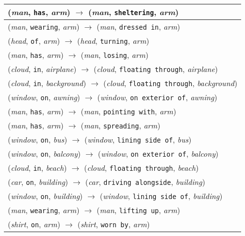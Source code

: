 \documentclass[runningheads]{llncs}
\begin{document}
{\begin{longtable}{ l }
(\textit{man}, \texttt{has}, \textit{arm}) $\rightarrow$ (\textit{man}, \texttt{sheltering}, \textit{arm}) \\ \hline
(\textit{man}, \texttt{wearing}, \textit{arm}) $\rightarrow$ (\textit{man}, \texttt{dressed in}, \textit{arm}) \\ \hline
(\textit{head}, \texttt{of}, \textit{arm}) $\rightarrow$ (\textit{head}, \texttt{turning}, \textit{arm}) \\ \hline
(\textit{man}, \texttt{has}, \textit{arm}) $\rightarrow$ (\textit{man}, \texttt{losing}, \textit{arm}) \\ \hline
(\textit{cloud}, \texttt{in}, \textit{airplane}) $\rightarrow$ (\textit{cloud}, \texttt{floating through}, \textit{airplane}) \\ \hline
(\textit{cloud}, \texttt{in}, \textit{background}) $\rightarrow$ (\textit{cloud}, \texttt{floating through}, \textit{background}) \\ \hline
(\textit{window}, \texttt{on}, \textit{awning}) $\rightarrow$ (\textit{window}, \texttt{on exterior of}, \textit{awning}) \\ \hline
(\textit{man}, \texttt{has}, \textit{arm}) $\rightarrow$ (\textit{man}, \texttt{pointing with}, \textit{arm}) \\ \hline
(\textit{man}, \texttt{has}, \textit{arm}) $\rightarrow$ (\textit{man}, \texttt{spreading}, \textit{arm}) \\ \hline
(\textit{window}, \texttt{on}, \textit{bus}) $\rightarrow$ (\textit{window}, \texttt{lining side of}, \textit{bus}) \\ \hline
(\textit{window}, \texttt{on}, \textit{balcony}) $\rightarrow$ (\textit{window}, \texttt{on exterior of}, \textit{balcony}) \\ \hline
(\textit{cloud}, \texttt{in}, \textit{beach}) $\rightarrow$ (\textit{cloud}, \texttt{floating through}, \textit{beach}) \\ \hline
(\textit{car}, \texttt{on}, \textit{building}) $\rightarrow$ (\textit{car}, \texttt{driving alongside}, \textit{building}) \\ \hline
(\textit{window}, \texttt{on}, \textit{building}) $\rightarrow$ (\textit{window}, \texttt{lining side of}, \textit{building}) \\ \hline
(\textit{man}, \texttt{wearing}, \textit{arm}) $\rightarrow$ (\textit{man}, \texttt{lifting up}, \textit{arm}) \\ \hline
(\textit{shirt}, \texttt{on}, \textit{arm}) $\rightarrow$ (\textit{shirt}, \texttt{worn by}, \textit{arm}) \\ \hline

\end{longtable}}
\end{document}
